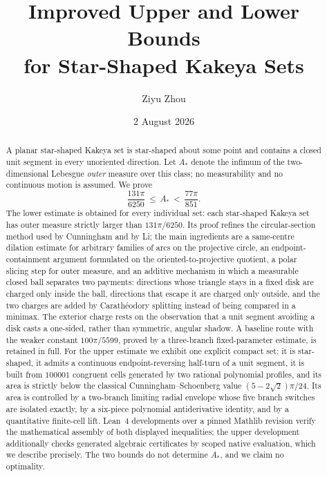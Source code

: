 \documentclass[11pt]{article}
\title{Improved Upper and Lower Bounds\\ for Star-Shaped Kakeya Sets}
\author{Ziyu Zhou}
\date{2 August 2026}
\theoremstyle{plain}
\theoremstyle{definition}
\theoremstyle{remark}
\newcommand{\Astar}{A_{*}}
\begin{document}
\maketitle

\begin{abstract}
A planar star-shaped Kakeya set is star-shaped about some point and contains a
closed unit segment in every unoriented direction. Let $\Astar$ denote the
infimum of the two-dimensional Lebesgue \emph{outer} measure over this class; no
measurability and no continuous motion is assumed. We prove
\[
  \frac{131\pi}{6250}\ \le\ \Astar\ <\ \frac{77\pi}{851}.
\]
The lower estimate is obtained for every individual set: each star-shaped
Kakeya set has outer measure strictly larger than $131\pi/6250$. Its proof
refines the circular-section method used by Cunningham and by Li; the main
ingredients are a same-centre dilation estimate for arbitrary families of arcs
on the projective circle, an endpoint-containment argument formulated on the
oriented-to-projective quotient, a polar slicing step for outer measure, and an
additive mechanism in which a measurable closed ball separates two payments:
directions whose triangle stays in a fixed disk are charged only inside the
ball, directions that escape it are charged only outside, and the two charges
are added by Carath\'eodory splitting instead of being compared in a minimax.
The exterior charge rests on the observation that a unit segment avoiding a
disk casts a one-sided, rather than symmetric, angular shadow. A baseline
route with the weaker constant $100\pi/5599$, proved by a three-branch
fixed-parameter estimate, is retained in full.
For the upper estimate we exhibit one explicit compact set: it is star-shaped,
it admits a continuous endpoint-reversing half-turn of a unit segment, it is
built from $100001$ congruent cells generated by two rational polynomial
profiles, and its area is strictly below the classical
Cunningham--Schoenberg value $(5-2\sqrt2)\pi/24$. Its area is controlled by a
two-branch limiting radial envelope whose five branch switches are isolated
exactly, by a six-piece polynomial antiderivative identity, and by a
quantitative finite-cell lift. Lean~4 developments over a pinned Mathlib
revision verify the mathematical assembly of both displayed inequalities; the
upper development additionally checks generated algebraic certificates by scoped
native evaluation, which we describe precisely. The two bounds do not determine
$\Astar$, and we claim no optimality.
\end{abstract}
\end{document}
